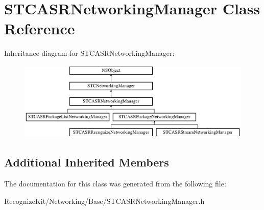 \hypertarget{interface_s_t_c_a_s_r_networking_manager}{}\section{S\+T\+C\+A\+S\+R\+Networking\+Manager Class Reference}
\label{interface_s_t_c_a_s_r_networking_manager}
Inheritance diagram for S\+T\+C\+A\+S\+R\+Networking\+Manager\+:\begin{figure}[H]
\begin{center}
\leavevmode
\includegraphics[height=3.718459cm]{interface_s_t_c_a_s_r_networking_manager}
\end{center}
\end{figure}
\subsection*{Additional Inherited Members}


The documentation for this class was generated from the following file\+:\begin{DoxyCompactItemize}
\item 
Recognize\+Kit/\+Networking/\+Base/S\+T\+C\+A\+S\+R\+Networking\+Manager.\+h\end{DoxyCompactItemize}
